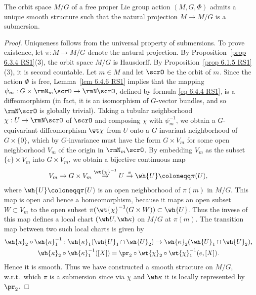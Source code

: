 \begin{cor}[{{\cite[Cor.~6.5.1]{RS1}}}]\label{cor 6.5.1 RS1}
    The orbit space $M\slash G$ of a free proper Lie group action $(M,G,\Phi)$ admits a unique smooth structure such that the natural projection $M\to M\slash G$ is a submersion.
\end{cor}
\begin{proof}
    Uniqueness follows from the universal property of submersions. To prove existence, let $\pi:M\to M\slash G$ denote the natural projection. By Proposition~\ref{prop 6.3.4 RS1}(3), the orbit space $M\slash G$ is Hausdorff. By Proposition~\ref{prop 6.1.5 RS1}(3), it is second countable. Let $m\in M$ and let $\scrO$ be the orbit of $m$. Since the action $\Phi$ is free, Lemma~\ref{lem 6.4.6 RS1} implies that the mapping $\psi_m:G\times \rmN_m \scrO\to \rmN \scrO$, defined by formula \eqref{eq 6.4.4 RS1}, is a diffeomorphism (in fact, it is an isomorphism of $G$-vector bundles, and so $\rmN \scrO$ is globally trivial). Taking a tubular neighborhood $\chi:U\to \rmN \scrO$ of $\scrO$ and composing $\chi$ with $\psi_m^{-1}$, we obtain a $G$-equivariant diffeomorphism $\wt\chi$ from $U$ onto a $G$-invariant neighborhood of $G\times\{0\}$, which by $G$-invariance must have the form $G\times V_m$ for some open neighborhood $V_m$ of the origin in $\rmN_m\scrO$. By embedding $V_m$ as the subset $\{e\}\times V_m$ into $G\times V_m$, we obtain a bijective continuous map
    \[V_m\to G\times V_m\overset{\wt{\chi}^{-1}}{\to}U\overset{\pi}{\to}\wh{U}\coloneqq \pi(U),\]
    where $\wh{U}\coloneqq \pi(U)$ is an open neighborhood of $\pi(m)$ in $M\slash G$. This map is open and hence a homeomorphism, because it maps an open subset $W\subset V_m$ to the open subset $\pi(\wt{\chi}^{-1}(G\times W))\subset \wh{U}$. Thus the invese of this map defines a local chart $(\wh U,\wh \kappa)$ on $M\slash G$ at $\pi(m)$. The transition map between two such local charts is given by
    \begin{gather}
        \wh{\kappa}_2\circ\wh{\kappa}_1^{-1}:\wh{\kappa}_1(\wh{U}_1\cap \wh{U}_2)\to \wh{\kappa}_2(\wh{U}_1\cap \wh{U}_2),\\
        \wh{\kappa}_2\circ\wh{\kappa}_1^{-1}([X])=\pr_2\circ\wt{\chi}_2\circ\wt{\chi}_1^{-1}(e,[X]).
    \end{gather}
    Hence it is smooth. Thus we have constructed a smooth structure on $M\slash G$, w.r.t.\ which $\pi$ is a submersion since via $\chi$ and $\wh\kappa$ it is locally represented by $\pr_2$.
\end{proof}

